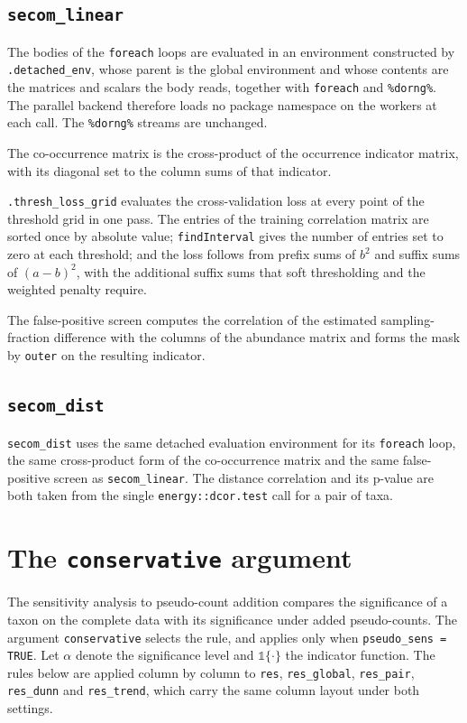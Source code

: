 \documentclass[11pt]{article}
\newcommand{\code}[1]{\texttt{#1}}
\begin{document}
\subsection*{\code{secom\_linear}}

The bodies of the \code{foreach} loops are evaluated in an environment
constructed by \code{.detached\_env}, whose parent is the global environment
and whose contents are the matrices and scalars the body reads, together with
\code{foreach} and \code{\%dorng\%}. The parallel backend therefore loads no
package namespace on the workers at each call. The \code{\%dorng\%} streams are
unchanged.

The co-occurrence matrix is the cross-product of the occurrence indicator
matrix, with its diagonal set to the column sums of that indicator.

\code{.thresh\_loss\_grid} evaluates the cross-validation loss at every point of
the threshold grid in one pass. The entries of the training correlation matrix
are sorted once by absolute value; \code{findInterval} gives the number of
entries set to zero at each threshold; and the loss follows from prefix sums of
$b^2$ and suffix sums of $(a - b)^2$, with the additional suffix sums that soft
thresholding and the weighted penalty require.

The false-positive screen computes the correlation of the estimated
sampling-fraction difference with the columns of the abundance matrix and forms
the mask by \code{outer} on the resulting indicator.

\subsection*{\code{secom\_dist}}

\code{secom\_dist} uses the same detached evaluation environment for its
\code{foreach} loop, the same cross-product form of the co-occurrence matrix and
the same false-positive screen as \code{secom\_linear}. The distance
correlation and its p-value are both taken from the single
\code{energy::dcor.test} call for a pair of taxa.

\section{The \texorpdfstring{\code{conservative}}{conservative} argument}

The sensitivity analysis to pseudo-count addition compares the significance of
a taxon on the complete data with its significance under added pseudo-counts.
The argument \code{conservative} selects the rule, and applies only when
\code{pseudo\_sens = TRUE}. Let $\alpha$ denote the significance level and
$\mathbb{1}\{\cdot\}$ the indicator function. The rules below are applied
column by column to \code{res}, \code{res\_global}, \code{res\_pair},
\code{res\_dunn} and \code{res\_trend}, which carry the same column layout under
both settings.
\end{document}
